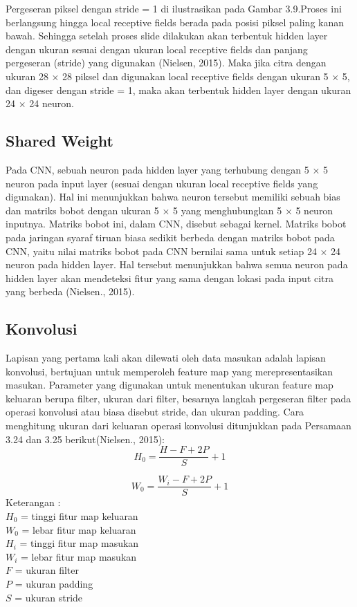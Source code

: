 Pergeseran piksel dengan stride = 1 di ilustrasikan pada Gambar 3.9.Proses ini berlangsung hingga local receptive fields berada pada posisi 
piksel paling kanan bawah. Sehingga setelah proses slide dilakukan akan terbentuk
hidden layer dengan ukuran sesuai dengan ukuran local receptive fields dan 
panjang pergeseran (stride) yang digunakan (Nielsen, 2015). Maka jika citra dengan ukuran 28 × 28 piksel dan digunakan local receptive fields
dengan ukuran 5 × 5, dan digeser dengan stride = 1, maka akan terbentuk
hidden layer dengan ukuran 24 × 24 neuron.
\subsection{Shared Weight}
Pada CNN, sebuah neuron pada hidden layer yang terhubung dengan 5 × 5 
neuron pada input layer (sesuai dengan ukuran local receptive fields yang 
digunakan). Hal ini menunjukkan bahwa neuron tersebut memiliki sebuah bias dan 
matriks bobot dengan ukuran 5 × 5 yang menghubungkan 5 × 5 neuron inputnya.
Matriks bobot ini, dalam CNN, disebut sebagai kernel. Matriks bobot pada jaringan 
syaraf tiruan biasa sedikit berbeda dengan matriks bobot pada CNN, yaitu nilai 
matriks bobot pada CNN bernilai sama untuk setiap 24 × 24 neuron pada hidden 
layer. Hal tersebut menunjukkan bahwa semua neuron pada hidden layer akan 
mendeteksi fitur yang sama dengan lokasi pada input citra yang berbeda (Nielsen., 
2015).

\subsection{Konvolusi}
Lapisan yang pertama kali akan dilewati oleh data masukan adalah lapisan konvolusi, bertujuan untuk memperoleh feature map yang merepresentasikan masukan. Parameter yang digunakan untuk menentukan ukuran feature map keluaran berupa filter, ukuran dari filter, besarnya langkah pergeseran filter pada operasi konvolusi atau biasa disebut stride, dan ukuran padding. Cara menghitung ukuran dari keluaran operasi konvolusi ditunjukkan pada Persamaan 3.24 dan 3.25  berikut(Nielsen., 2015):
\begin{equation}
H_0 = \frac{H-F+2P}{S}+1
\end{equation}

\begin{equation}
W_0 = \frac{W_i-F+2P}{S}+1
\end{equation}
Keterangan : \\
\(H_0\) = tinggi fitur map keluaran
\\
\(W_0\) = lebar fitur map keluaran\\
\(H_i\) = tinggi fitur map masukan
\\
\(W_i\) = lebar fitur map masukan
\\
\(F\)  = ukuran filter
\\
\(P\)  = ukuran padding
\\
\(S\)  = ukuran stride 

